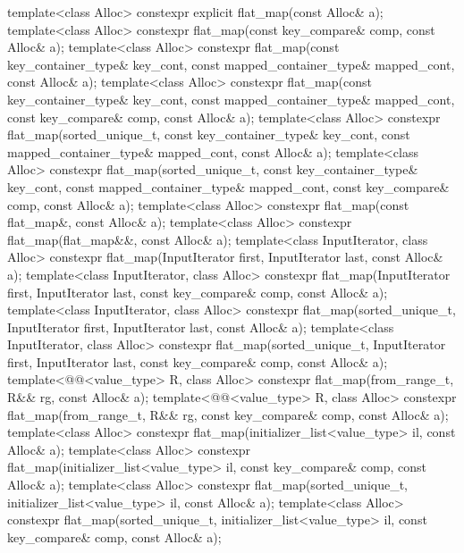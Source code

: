 \begin{codeblock}
{{    template<class Alloc>
      constexpr explicit flat_map(const Alloc& a);
    template<class Alloc>
      constexpr flat_map(const key_compare& comp, const Alloc& a);
    template<class Alloc>
      constexpr flat_map(const key_container_type& key_cont,
                         const mapped_container_type& mapped_cont,
                         const Alloc& a);
    template<class Alloc>
      constexpr flat_map(const key_container_type& key_cont,
                         const mapped_container_type& mapped_cont,
                         const key_compare& comp, const Alloc& a);
    template<class Alloc>
      constexpr flat_map(sorted_unique_t, const key_container_type& key_cont,
                         const mapped_container_type& mapped_cont, const Alloc& a);
    template<class Alloc>
      constexpr flat_map(sorted_unique_t, const key_container_type& key_cont,
                         const mapped_container_type& mapped_cont, const key_compare& comp,
                         const Alloc& a);
    template<class Alloc>
      constexpr flat_map(const flat_map&, const Alloc& a);
    template<class Alloc>
      constexpr flat_map(flat_map&&, const Alloc& a);
    template<class InputIterator, class Alloc>
      constexpr flat_map(InputIterator first, InputIterator last, const Alloc& a);
    template<class InputIterator, class Alloc>
      constexpr flat_map(InputIterator first, InputIterator last,
                         const key_compare& comp, const Alloc& a);
    template<class InputIterator, class Alloc>
      constexpr flat_map(sorted_unique_t, InputIterator first, InputIterator last,
                         const Alloc& a);
    template<class InputIterator, class Alloc>
      constexpr flat_map(sorted_unique_t, InputIterator first, InputIterator last,
                         const key_compare& comp, const Alloc& a);
    template<@@<value_type> R, class Alloc>
      constexpr flat_map(from_range_t, R&& rg, const Alloc& a);
    template<@@<value_type> R, class Alloc>
      constexpr flat_map(from_range_t, R&& rg, const key_compare& comp, const Alloc& a);
    template<class Alloc>
      constexpr flat_map(initializer_list<value_type> il, const Alloc& a);
    template<class Alloc>
      constexpr flat_map(initializer_list<value_type> il, const key_compare& comp,
                         const Alloc& a);
    template<class Alloc>
      constexpr flat_map(sorted_unique_t, initializer_list<value_type> il, const Alloc& a);
    template<class Alloc>
      constexpr flat_map(sorted_unique_t, initializer_list<value_type> il,
                         const key_compare& comp, const Alloc& a);

}}
\end{codeblock}
